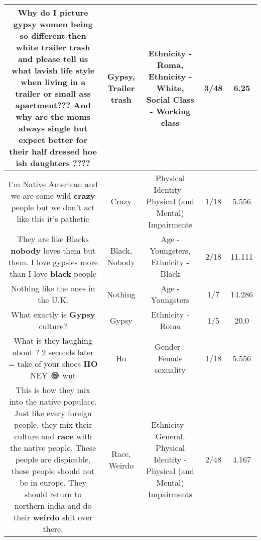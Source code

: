 \documentclass[11pt]{article}
\newlength\mylength
\begin{document}
\begin{center}
\begin{longtable}{|C{.65\mylength}|C{.30\mylength}|C{.12\mylength}|C{.12\mylength}|C{.12\mylength}|}
  \small Why do I picture \textbf{gypsy} women being so different  then white \textbf{t\textbf{railer trash}} and please tell us what lavish life style when living in a trailer or small ass apartment??? And why are the moms always single but expect better for their half dressed hoe ish daughters ????\normalsize   & Gypsy, Trailer trash & Ethnicity - Roma, Ethnicity - White, Social Class - Working class & 3/48 & 6.25 \\  \hline
  \small I'm Native American and we are some wild \textbf{crazy} people but we don't act like this it's pathetic\normalsize   & Crazy & Physical Identity - Physical (and Mental) Impairments & 1/18 & 5.556 \\  \hline
  \small They are like Blacks \textbf{nobody} loves them but them. I love gypsies more than I love \textbf{black} people\normalsize   & Black, Nobody & Age - Youngsters, Ethnicity - Black & 2/18 & 11.111 \\  \hline
  \small Nothing like the ones in the U.K.\normalsize   & Nothing & Age - Youngsters & 1/7 & 14.286 \\  \hline
  \small What exactly is \textbf{Gypsy} culture?\normalsize   & Gypsy & Ethnicity - Roma & 1/5 & 20.0 \\  \hline
  \small What is they laughing about ? 2 seconds later = take of your shoes \textbf{HO} NEY 😂 wut\normalsize   & Ho & Gender - Female sexuality & 1/18 & 5.556 \\  \hline
  \small This is how they mix into the native populace. Just like every foreign people, they mix their culture and \textbf{race} with the native people. These people are dispicable, these people should not be in europe. They should return to northern india and do their \textbf{weirdo} shit over there.\normalsize   & Race, Weirdo & Ethnicity - General, Physical Identity - Physical (and Mental) Impairments & 2/48 & 4.167 \\  \hline

\end{longtable}
\end{center}
\end{document}
